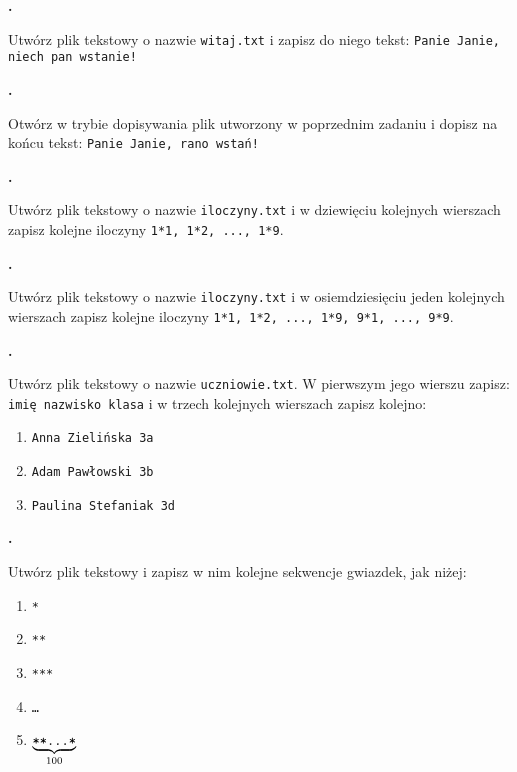 \documentclass[a4paper]{article}
\begin{document}
\textbf{.}\addtocounter{zadanie}{1} Utwórz plik tekstowy o nazwie \texttt{witaj.txt} i zapisz do niego tekst: \texttt{Panie Janie, niech pan wstanie!}

\textbf{.}\addtocounter{zadanie}{1} Otwórz w trybie dopisywania plik utworzony w poprzednim zadaniu i dopisz na końcu tekst: \texttt{Panie Janie, rano wstań!}

\textbf{.}\addtocounter{zadanie}{1} Utwórz plik tekstowy o nazwie \texttt{iloczyny.txt} i w dziewięciu kolejnych wierszach zapisz kolejne iloczyny \texttt{1*1, 1*2, ..., 1*9}.

\textbf{.}\addtocounter{zadanie}{1} Utwórz plik tekstowy o nazwie \texttt{iloczyny.txt} i w osiemdziesięciu jeden kolejnych wierszach zapisz kolejne iloczyny \texttt{1*1, 1*2, ..., 1*9, 9*1, ..., 9*9}.

\textbf{.}\addtocounter{zadanie}{1} Utwórz plik tekstowy o nazwie \texttt{uczniowie.txt}. W pierwszym jego wierszu zapisz: \texttt{imię nazwisko klasa} i w trzech  kolejnych wierszach zapisz kolejno:
\begin{enumerate}[label=]
    \item \texttt{Anna Zielińska 3a}
    \item \texttt{Adam Pawłowski 3b}
    \item \texttt{Paulina Stefaniak 3d}
\end{enumerate}

\textbf{.}\addtocounter{zadanie}{1} Utwórz plik tekstowy i zapisz w nim kolejne sekwencje gwiazdek, jak niżej:
\begin{enumerate}[label=]
    \item \texttt{*}
    \item \texttt{**}
    \item \texttt{***}
    \item \texttt{\dots}
    \item $\underbrace{\texttt{**\dots *}}_{100}$
\end{enumerate}
\end{document}
